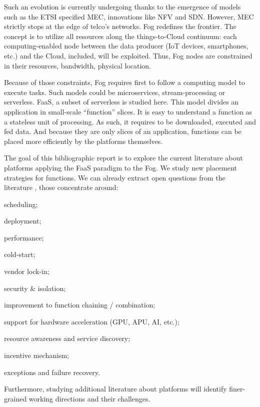 \documentclass[11pt]{sdm}
\begin{document}
Such an evolution is currently undergoing thanks to the emergence of models such as the \gls{ETSI} specified \gls{MEC}, innovations like \gls{NFV} and \gls{SDN}. However, \gls{MEC} strictly stops at the edge of telco's networks. Fog redefines the frontier. The concept is to utilize all resources along the things-to-Cloud continuum: each computing-enabled node between the data producer (\gls{IoT} devices, smartphones, etc.) and the Cloud, included, will be exploited. Thus, Fog nodes are constrained in their resources, bandwidth, physical location.

Because of those constraints, Fog requires first to follow a computing model to execute tasks. Such models could be microservices, stream-processing or serverless. \gls{FaaS}, a subset of serverless is studied here. This model divides an application in small-scale ``function'' slices. It is easy to understand a function as a stateless unit of processing. As such, it requires to be downloaded, executed and fed data. And because they are only slices of an application, functions can be placed more efficiently by the platforms themselves.

The goal of this bibliographic report is to explore the current literature about platforms applying the \gls{FaaS} paradigm to the Fog. We study new placement strategies for functions. We can already extract open questions from the literature \cite{kjorveziroski_iot_2021,xie_when_2021}, those concentrate around:
\begin{enumerate*}[(1)]
	\item scheduling;
	\item deployment;
	\item performance;
	\item cold-start;
	\item vendor lock-in;
	\item security \& isolation;
	\item improvement to function chaining / combination;
	\item support for hardware acceleration (\gls{GPU}, \gls{APU}, \gls{AI}, etc.);
	\item resource awareness and service discovery;
	\item incentive mechanism;
	\item exceptions and failure recovery.
\end{enumerate*}
Furthermore, studying additional literature about platforms will identify finer-grained working directions and their challenges.
\end{document}
